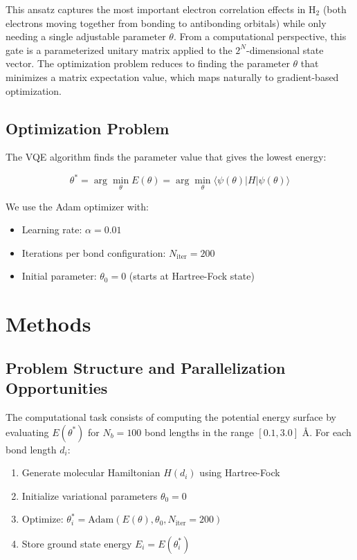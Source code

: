 \documentclass[11pt]{article}
\begin{document}
This ansatz captures the most important electron correlation effects in H$_2$ (both electrons moving together from bonding to antibonding orbitals) while only needing a single adjustable parameter $\theta$. From a computational perspective, this gate is a parameterized unitary matrix applied to the $2^N$-dimensional state vector. The optimization problem reduces to finding the parameter $\theta$ that minimizes a matrix expectation value, which maps naturally to gradient-based optimization.

\subsection{Optimization Problem}

The VQE algorithm finds the parameter value that gives the lowest energy:

\begin{equation}
    \theta^* = \arg\min_\theta E(\theta) = \arg\min_\theta \langle \psi(\theta) | H | \psi(\theta) \rangle
\end{equation}

We use the Adam optimizer with:
\begin{itemize}
    \item Learning rate: $\alpha = 0.01$
    \item Iterations per bond configuration: $N_{\text{iter}} = 200$
    \item Initial parameter: $\theta_0 = 0$ (starts at Hartree-Fock state)
\end{itemize}

\section{Methods}

\subsection{Problem Structure and Parallelization Opportunities}

The computational task consists of computing the potential energy surface by evaluating $E(\theta^*)$ for $N_b = 100$ bond lengths in the range $[0.1, 3.0]$ \AA. For each bond length $d_i$:

\begin{enumerate}
    \item Generate molecular Hamiltonian $H(d_i)$ using Hartree-Fock
    \item Initialize variational parameters $\theta_0 = 0$
    \item Optimize: $\theta^*_i = \text{Adam}(E(\theta), \theta_0, N_{\text{iter}} = 200)$
    \item Store ground state energy $E_i = E(\theta^*_i)$
\end{enumerate}
\end{document}
